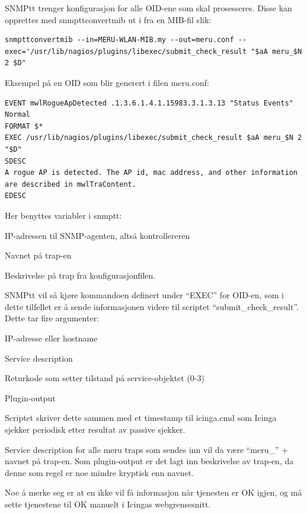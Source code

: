 SNMPtt trenger konfigurasjon for alle OID-ene som skal prosesseres. Disse kan opprettes med snmpttconvertmib ut i fra en MIB-fil slik:
\begin{lstlisting}[style=example]
snmpttconvertmib --in=MERU-WLAN-MIB.my --out=meru.conf --exec='/usr/lib/nagios/plugins/libexec/submit_check_result "$aA meru_$N 2 $D"
\end{lstlisting}

Eksempel på en OID som blir generert i filen meru.conf:
\begin{lstlisting}[style=example]
EVENT mwlRogueApDetected .1.3.6.1.4.1.15983.3.1.3.13 "Status Events" Normal
FORMAT $*
EXEC /usr/lib/nagios/plugins/libexec/submit_check_result $aA meru_$N 2 "$D"
SDESC
A rogue AP is detected. The AP id, mac address, and other information are described in mwlTraContent.
EDESC
\end{lstlisting}

Her benyttes variabler i snmptt\cite{snmptrans}:
\begin{itemize*}
	\item IP-adressen til SNMP-agenten, altså kontrollereren
	\item Navnet på trap-en
	\item Beskrivelse på trap fra konfigurasjonfilen.
\end{itemize*}

SNMPtt vil så kjøre kommandoen definert under ``EXEC'' for OID-en, som i dette tilfellet er å sende informasjonen videre til scriptet ``submit\_check\_result''. Dette tar fire argumenter:

\begin{itemize*}
	\item IP-adresse eller hostname 
	\item Service description
	\item Returkode som setter tilstand på service-objektet (0-3)
	\item Plugin-output
\end{itemize*}
Scriptet skriver dette sammen med et timestamp til icinga.cmd som Icinga sjekker periodisk etter resultat av passive sjekker.

Service description for alle meru traps som sendes inn vil da være ``meru\_'' + navnet på trap-en. Som plugin-output er det lagt inn beskrivelse av trap-en, da denne som regel er noe mindre kryptisk enn navnet.

Noe å merke seg er at en ikke vil få informasjon når tjenesten er OK igjen, og må sette tjenestene til OK manuelt i Icingas webgrensesnitt.

